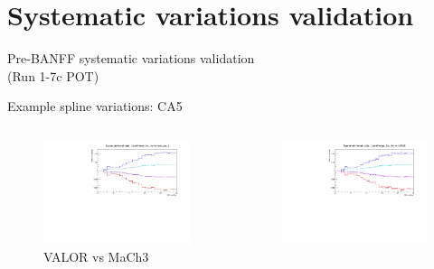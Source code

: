 \documentclass{beamer}
\begin{document}
\section{Systematic variations validation}
\begin{frame}
	\centering
	\Large Pre-BANFF systematic variations validation\\(Run 1-7c POT)
\end{frame}

\begin{frame}{Example spline variations: CA5}
	\centering
	\begin{columns}
		\begin{column}{0.5\paperwidth}
			\begin{figure}
				\includegraphics[page=11, trim={0cm 0cm 0cm 0cm}, clip, scale=0.35] {images/variations/valor_mach3/variations_prebanff_unosc_1Re}
				\caption*{VALOR vs MaCh3}
			\end{figure}
		\end{column}
		\begin{column}{0.5\paperwidth}
			\begin{figure}
				\includegraphics[page=7, trim={0cm 0cm 0cm 0cm}, clip, scale=0.35] {images/variations/valor_ptheta/variations_prebanff_unosc_1Re}

\end{figure}
\end{column}
\end{columns}
\end{frame}
\end{document}
